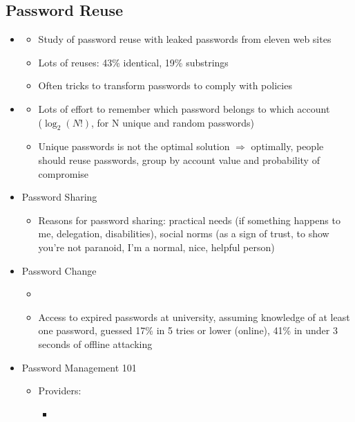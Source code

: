 \documentclass[a4paper,12pt]{scrartcl}
\begin{document}
\subsection{Password Reuse}
\begin{itemize}
	\item
		\begin{itemize}
			\item
				Study of password reuse with leaked passwords from eleven web sites
			\item
				Lots of reuses: 43\% identical, 19\% substrings
			\item
				Often tricks to transform passwords to comply with policies
		\end{itemize}
	\item
		\begin{itemize}
			\item
				Lots of effort to remember which password belongs to which account \\
				($\log_2(N!)$, for N unique and random passwords)
			\item
				Unique passwords is not the optimal solution $\Rightarrow$ optimally, people should reuse passwords, group by account value and probability of compromise
		\end{itemize}
	\item
		Password Sharing
		\begin{itemize}
			\item
				Reasons for password sharing: practical needs (if something happens to me, delegation, disabilities), social norms (as a sign of trust, to show you're not paranoid, I'm a normal, nice, helpful person)
		\end{itemize}
	\item
		Password Change
		\begin{itemize}
			\item
			\item
				Access to expired passwords at university, assuming knowledge of at least one password, guessed 17\% in 5 tries or lower (online), 41\% in under 3 seconds of offline attacking
		\end{itemize}
	\item
		Password Management 101
		\begin{itemize}
			\item
				Providers:
				\begin{itemize}
					\item

\end{itemize}
\end{itemize}
\end{itemize}
\end{document}

